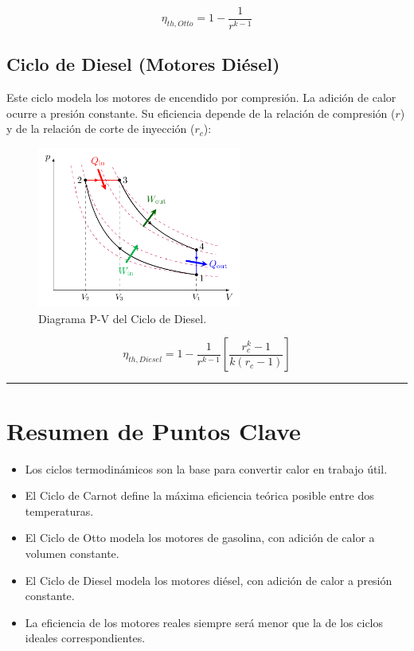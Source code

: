 \documentclass{article}
\begin{document}
$$ \eta_{th,Otto} = 1 - \frac{1}{r^{k-1}} $$

\subsection*{Ciclo de Diesel (Motores Diésel)}

Este ciclo modela los motores de encendido por compresión. La adición de calor ocurre a presión constante. Su eficiencia depende de la relación de compresión ($r$) y de la relación de corte de inyección ($r_c$):

\begin{figure}[h!]
    \centering
    \includegraphics[width=0.6\textwidth]{img/diagrama_pv_ciclo_diesel.png}
    \caption{Diagrama P-V del Ciclo de Diesel.}
    \label{fig:diesel_cycle}
\end{figure}

$$   \eta_{th,Diesel} = 1 - \frac{1}{r^{k-1}} \left[ \frac{r_c^k - 1}{k(r_c - 1)} \right]  $$

\vspace{5mm}
\hrule
\vspace{5mm}

\section*{Resumen de Puntos Clave}

\begin{itemize}
    \item Los ciclos termodinámicos son la base para convertir calor en trabajo útil.
    \item El Ciclo de Carnot define la máxima eficiencia teórica posible entre dos temperaturas.
    \item El Ciclo de Otto modela los motores de gasolina, con adición de calor a volumen constante.
    \item El Ciclo de Diesel modela los motores diésel, con adición de calor a presión constante.
    \item La eficiencia de los motores reales siempre será menor que la de los ciclos ideales correspondientes.
\end{itemize}
\end{document}
